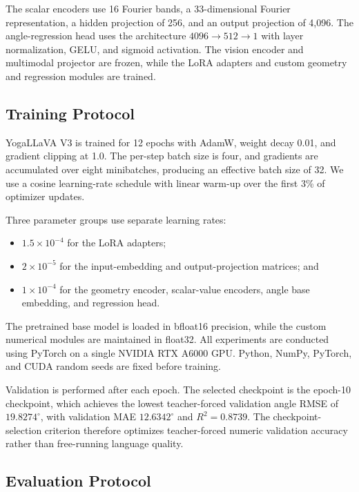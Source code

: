 The scalar encoders use 16 Fourier bands, a 33-dimensional Fourier
representation, a hidden projection of 256, and an output projection of
4,096. The angle-regression head uses the architecture
$4096\!\rightarrow\!512\!\rightarrow\!1$ with layer normalization,
GELU, and sigmoid activation. The vision encoder and multimodal
projector are frozen, while the LoRA adapters and custom geometry and
regression modules are trained.

\subsection{Training Protocol}
\label{sec:training_protocol}

YogaLLaVA V3 is trained for 12 epochs with AdamW, weight decay 0.01,
and gradient clipping at 1.0. The per-step batch size is four, and
gradients are accumulated over eight minibatches, producing an effective
batch size of 32. We use a cosine learning-rate schedule with linear
warm-up over the first 3\% of optimizer updates.

Three parameter groups use separate learning rates:
\begin{itemize}
    \item $1.5\times10^{-4}$ for the LoRA adapters;
    \item $2\times10^{-5}$ for the input-embedding and output-projection
    matrices; and
    \item $1\times10^{-4}$ for the geometry encoder, scalar-value
    encoders, angle base embedding, and regression head.
\end{itemize}

The pretrained base model is loaded in bfloat16 precision, while the
custom numerical modules are maintained in float32. All experiments are
conducted using PyTorch on a single NVIDIA RTX A6000 GPU. Python, NumPy,
PyTorch, and CUDA random seeds are fixed before training.

Validation is performed after each epoch. The selected checkpoint is
the epoch-10 checkpoint, which achieves the lowest teacher-forced
validation angle RMSE of $19.8274^\circ$, with validation MAE
$12.6342^\circ$ and $R^2=0.8739$. The checkpoint-selection criterion
therefore optimizes teacher-forced numeric validation accuracy rather
than free-running language quality.

\subsection{Evaluation Protocol}
\label{sec:evaluation_protocol}

